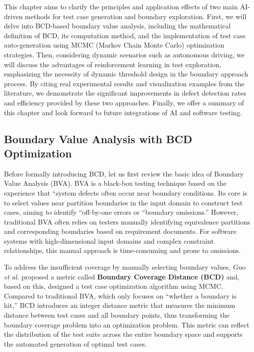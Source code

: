 \documentclass[manuscript,screen,review]{acmart}
\begin{document}
This chapter aims to clarify the principles and application effects of two main AI-driven methods for test case generation and boundary exploration. First, we will delve into BCD-based boundary value analysis, including the mathematical definition of BCD, its computation method, and the implementation of test case auto-generation using MCMC (Markov Chain Monte Carlo) optimization strategies. Then, considering dynamic scenarios such as autonomous driving, we will discuss the advantages of reinforcement learning in test exploration, emphasizing the necessity of dynamic threshold design in the boundary approach process. By citing real experimental results and visualization examples from the literature, we demonstrate the significant improvements in defect detection rates and efficiency provided by these two approaches. Finally, we offer a summary of this chapter and look forward to future integrations of AI and software testing.
\subsection{Boundary Value Analysis with BCD Optimization}

Before formally introducing BCD, let us first review the basic idea of Boundary Value Analysis (BVA). BVA is a black-box testing technique based on the experience that ``system defects often occur near boundary conditions. Its core is to select values near partition boundaries in the input domain to construct test cases, aiming to identify ``off-by-one errors or ``boundary omissions.'' However, traditional BVA often relies on testers manually identifying equivalence partitions and corresponding boundaries based on requirement documents. For software systems with high-dimensional input domains and complex constraint relationships, this manual approach is time-consuming and prone to omissions.

To address the insufficient coverage by manually selecting boundary values, Guo \textit{et al.}\cite{Guo2024} proposed a metric called \textbf{Boundary Coverage Distance (BCD)} and, based on this, designed a test case optimization algorithm using MCMC. Compared to traditional BVA, which only focuses on ``whether a boundary is hit,'' BCD introduces an integer distance metric that measures the minimum distance between test cases and all boundary points, thus transforming the boundary coverage problem into an optimization problem. This metric can reflect the distribution of the test suite across the entire boundary space and supports the automated generation of optimal test cases.
\end{document}
